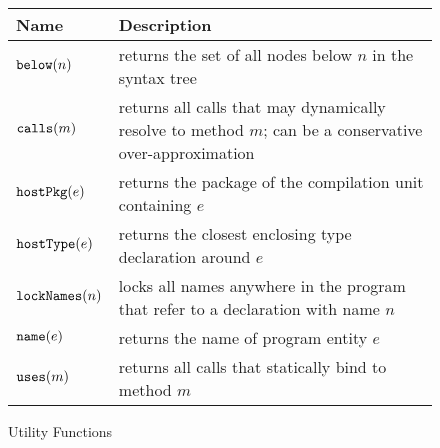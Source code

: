 \begin{figure}
\begin{center}
\begin{tabular}{|l|p{5.3cm}|}
\hline
\textbf{Name} & \textbf{Description} \\ \hline\hline
$\text{\texttt{below}}(n)$ & returns the set of all nodes below $n$ in the syntax tree \\
$\text{\texttt{calls}}(m)$ & returns all calls that may dynamically resolve to method $m$; can be a conservative over-approximation \\
$\text{\texttt{hostPkg}}(e)$ & returns the package of the compilation unit containing $e$ \\
$\text{\texttt{hostType}}(e)$ & returns the closest enclosing type declaration around $e$ \\
$\text{\texttt{lockNames}}(n)$ & locks all names anywhere in the program that refer to a declaration with name $n$ \\
$\text{\texttt{name}}(e)$ & returns the name of program entity $e$ \\
$\text{\texttt{uses}}(m)$ & returns all calls that statically bind to method $m$ \\
\hline
\end{tabular}
\end{center}
\caption{Utility Functions}
\label{fig:utility}
\end{figure}
